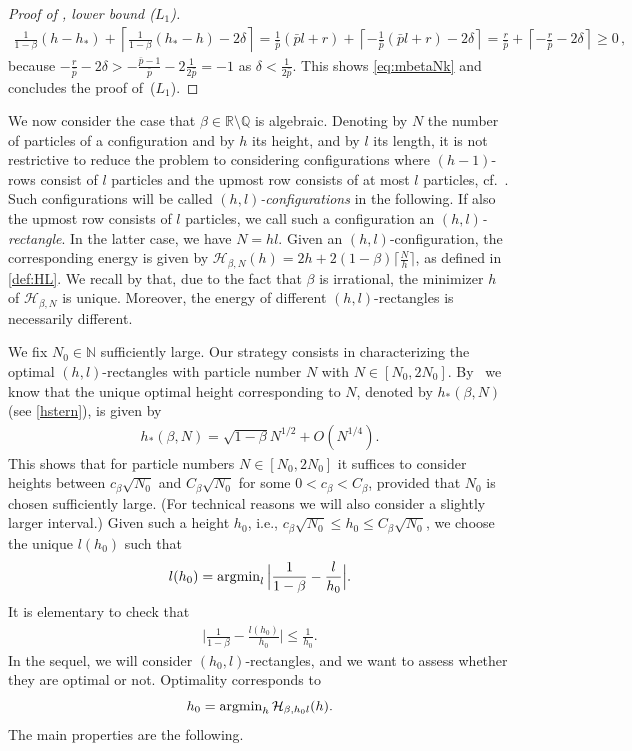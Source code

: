 \documentclass[reqno]{amsart}
\theoremstyle{plain}
\theoremstyle{definition}
\numberwithin{equation}{section}
\newcommand{\N}{\mathbb{N}}
\newcommand{\R}{\mathbb{R}}
\begin{document}
\begin{proof}[Proof of ,  lower bound   {\rm ($L_1$)}]
\begin{align*}
 \frac{1}{1-\beta}    (h-h_*) + \left\lceil \frac{1}{1-\beta}    (h_*-h)-2\delta\right\rceil = \frac{1}{\bar{p}}(\bar{p}l+r) +  \left\lceil -\frac{1}{\bar{p}}(\bar{p}l+r) -2\delta\right\rceil = \frac{r}{\bar{p}} +\left\lceil -\frac{r}{\bar{p}}-2\delta\right\rceil\geq 0\,,
\end{align*}
because $-\frac{r}{\bar{p}}-2\delta > -\frac{\bar{p}-1}{\bar{p}} -2 \frac{1}{2\bar{p}}=  - 1 $ as  $\delta< \frac{1}{2\bar{p}}$. This shows \eqref{eq:mbetaNk} and concludes the proof of~{\rm ($L_1$)}.
\end{proof}

 We now consider the case that $\beta \in \R \setminus \mathbb{Q}$ is algebraic. Denoting by $N$ the number of  particles  of a configuration and by $h$ its height, and  by $l$ its length, it is not restrictive to reduce  the problem to considering configurations where $(h-1)$-rows consist of $l$  particles  and the upmost row consists of at most $l$  particles,   cf.\ .  Such configurations will be called \emph{$(h,l)$-configurations} in the following.   If also the upmost row consists of $l$  particles,   we call such a configuration an  \emph{$(h,l)$-rectangle}. In the latter case, we have $N = hl$. Given an  $(h,l)$-configuration, the corresponding energy is given by  $\mathcal{H}_{\beta,N}(h)  = 2 h  + 2(1-\beta)   \lceil \frac{N}{h}  \rceil$, as defined in \eqref{def:HL}. We recall  by   that,  due to the fact that $\beta$ is irrational, the minimizer $h$ of $\mathcal{H}_{\beta,N}$ is unique.   Moreover, the energy of different $(h,l)$-rectangles is necessarily different.


We fix $N_0 \in \N$ sufficiently large. Our strategy consists in characterizing the optimal $(h,l)$-rectangles with   particle  number $N$ with $N \in [N_0,2N_0]$.  By~ we know that  the unique optimal height corresponding to  $N$,  denoted by $h_*(\beta,N)$ (see \eqref{hstern}),  is given by 
\begin{align}\label{hrange}
h_*(\beta,N) =  \sqrt{1-\beta } N^{1/2} + O(N^{1/4}).
\end{align}
 This shows that for  particle  numbers  $N \in [N_0,2N_0]$ it suffices to consider heights between $c_\beta\sqrt{N_0}$ and $C_\beta\sqrt{N_0}$  for some  $0<c_\beta<C_\beta$, provided that $N_0$ is chosen sufficiently large.  (For technical reasons we will also consider a slightly larger interval.)   Given  such a height $h_0 $,  i.e.,  $c_\beta\sqrt{N_0} \le h_0 \le C_\beta\sqrt{N_0}$,   we choose the unique $l(h_0)$ such that 
$$l(h_0) = {\rm argmin}_l \,   \Big| \frac{1}{1-\beta}     - \frac{l}{h_0}\Big|.  $$
It is elementary to check that  
\begin{align}\label{best approx}
\Big| \frac{1}{1-\beta}      - \frac{l(h_0)}{h_0}\Big| \le \frac{1}{h_0}. 
\end{align}
In the sequel, we will consider $(h_0,l)$-rectangles, and we want to assess whether they are optimal or not. Optimality  corresponds to 
$$h_0  = {\rm argmin}_h \, \mathcal{H}_{\beta,h_0l}    (h). $$
The main properties are the following.
\end{document}
